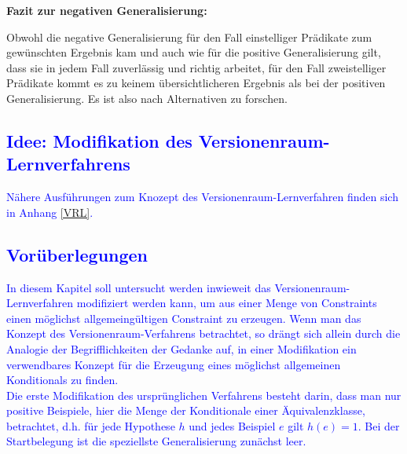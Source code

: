 \documentclass[a4paper, 11pt]{book}
\begin{document}
\textbf{{\Large Fazit zur negativen Generalisierung:}} \label{Fazit neg Gen} 

\noindent
Obwohl die negative Generalisierung für den Fall einstelliger Prädikate zum gewünschten Ergebnis kam und auch wie für die positive Generalisierung gilt, dass sie in jedem Fall zuverlässig und richtig arbeitet, für den Fall zweistelliger Prädikate kommt es zu keinem übersichtlicheren Ergebnis als bei der positiven Generalisierung. Es ist also nach Alternativen zu forschen.

\textcolor{blue}{
	\section{Idee: Modifikation des Versionenraum-Lernverfahrens} \label{Verwendbar VRL} 
	Nähere Ausführungen zum Knozept des Versionenraum-Lernverfahren finden sich in Anhang \ref{VRL}.\\
	\subsection{Vorüberlegungen}
	In diesem Kapitel soll untersucht werden inwieweit das Versionenraum-Lernverfahren modifiziert werden kann, um aus einer Menge von Constraints einen möglichst allgemeingültigen Constraint zu erzeugen. Wenn man das Konzept des Versionenraum-Verfahrens betrachtet, so drängt sich allein durch die Analogie der Begrifflichkeiten der Gedanke auf, in einer Modifikation ein verwendbares Konzept für die Erzeugung eines möglichst allgemeinen Konditionals zu finden.
	\\
	Die erste Modifikation des ursprünglichen Verfahrens besteht darin, dass man nur positive Beispiele, hier die Menge der Konditionale einer Äquivalenzklasse, betrachtet, d.h. für jede Hypothese $ h $ und jedes Beispiel $ e $ gilt $ h(e) = 1 $.
	Bei der Startbelegung ist die speziellste Generalisierung zunächst leer. 
}
\end{document}
